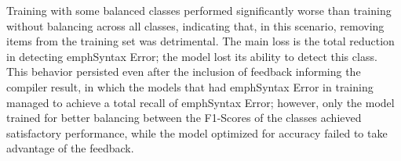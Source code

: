 Training with some balanced classes performed significantly worse than training without balancing across all classes, indicating that, in this scenario, removing items from the training set was detrimental. The main loss is the total reduction in detecting emph{Syntax Error}; the model lost its ability to detect this class. This behavior persisted even after the inclusion of feedback informing the compiler result, in which the models that had emph{Syntax Error} in training managed to achieve a total recall of emph{Syntax Error}; however, only the model trained for better balancing between the F1-Scores of the classes achieved satisfactory performance, while the model optimized for accuracy failed to take advantage of the feedback.